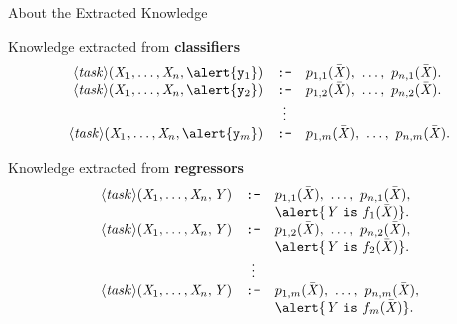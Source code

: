 \documentclass[presentation]{beamer}\mode<presentation>{\usetheme{AMSBolognaFC}}
\begin{document}
\begin{frame}[allowframebreaks]{About the Extracted Knowledge}

    \begin{block}{Knowledge extracted from \textbf{classifiers}}
        \begin{equation*}
            \begin{array}{rcl}
                \logicrule{\meta{task}(\var{X}_1, \ldots, \var{X}_n, \alert{\const{y}_1})}{p_{1,1}(\bar{\var{X}}),\ \ldots,\ p_{n,1}(\bar{\var{X}})}.
                \\
                \logicrule{\meta{task}(\var{X}_1, \ldots, \var{X}_n, \alert{\const{y}_2})}{p_{1,2}(\bar{\var{X}}),\ \ldots,\ p_{n,2}(\bar{\var{X}})}.
                \\
                & \vdots
                \\
                \logicrule{\meta{task}(\var{X}_1, \ldots, \var{X}_n, \alert{\const{y}_m})}{p_{1,m}(\bar{\var{X}}),\ \ldots,\ p_{n,m}(\bar{\var{X}})}.
            \end{array}
        \end{equation*}
    \end{block}

    \framebreak

    \begin{block}{Knowledge extracted from \textbf{regressors}}
        \begin{equation*}
            \begin{array}{rcl}
                \logicrule{\meta{task}(\var{X}_1, \ldots, \var{X}_n, \var{Y})}{p_{1,1}(\bar{\var{X}}),\ \ldots,\ p_{n,1}(\bar{\var{X}})},
                \\
                & & \alert{\var{Y}\ \const{is}\ f_1(\bar{\var{X}})}.
                \\
                \logicrule{\meta{task}(\var{X}_1, \ldots, \var{X}_n, \var{Y})}{p_{1,2}(\bar{\var{X}}),\ \ldots,\ p_{n,2}(\bar{\var{X}})},
                \\
                & & \alert{\var{Y}\ \const{is}\ f_2(\bar{\var{X}})}.
                \\
                & \vdots
                \\
                \logicrule{\meta{task}(\var{X}_1, \ldots, \var{X}_n, \var{Y})}{p_{1,m}(\bar{\var{X}}),\ \ldots,\ p_{n,m}(\bar{\var{X}})},
                \\
                & & \alert{\var{Y}\ \const{is}\ f_m(\bar{\var{X}})}.
            \end{array}
        \end{equation*}
    \end{block}


\end{frame}
\end{document}
